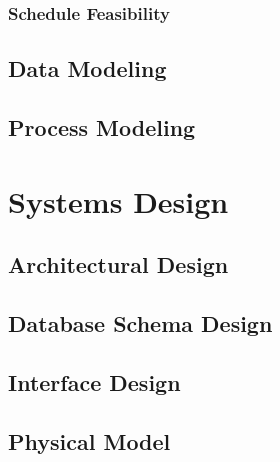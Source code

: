 \subsubsection{Schedule Feasibility}

\subsection{Data Modeling}

\subsection{Process Modeling}

\section{Systems Design}

\subsection{Architectural Design}

\subsection{Database Schema Design}

\subsection{Interface Design}

\subsection{Physical Model}
